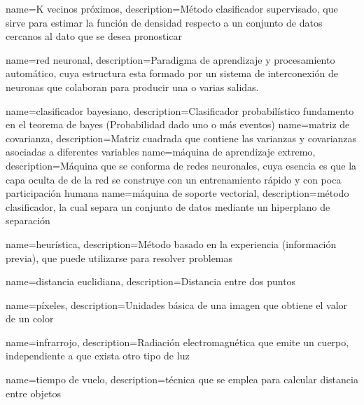 {
 name={K vecinos pr\'oximos},
 description={M\'etodo clasificador supervisado, que sirve para estimar la funci\'on de densidad respecto a un conjunto de datos cercanos al dato que se desea pronosticar}
 } 
 
 {
 name={red neuronal},
 description={Paradigma de aprendizaje y procesamiento autom\'atico, cuya estructura esta formado por un sistema de interconexi\'on de neuronas que colaboran para producir una o varias salidas.}
 }
 
 {
 name={clasificador bayesiano},
 description={Clasificador probabil\'istico fundamento en el teorema de bayes (Probabilidad dado uno o m\'as eventos)}
 }
 {
 name={matriz de covarianza},
 description={Matriz cuadrada que contiene las varianzas y covarianzas asociadas a diferentes variables}
 } 
 {
 name={m\'aquina de aprendizaje extremo},
 description={M\'aquina que se conforma de redes neuronales, cuya esencia es que la capa oculta de de la red se construye con un entrenamiento r\'apido y con poca participaci\'on humana}
 }  
 {
 name={m\'aquina de soporte vectorial},
 description={m\'etodo clasificador, la cual separa un conjunto de datos mediante un hiperplano de separaci\'on}
 }
 
 {
 name={heur\'istica},
 description={M\'etodo basado en la experiencia (informaci\'on previa), que puede utilizarse para resolver problemas }
 }

 {	
 name={distancia euclidiana},
 description={Distancia entre dos puntos}
 }
 
 
 {
 name={p\'ixeles},
 description={Unidades b\'asica de una imagen que obtiene el valor de un color}
 }
 
 {
 name={infrarrojo},
 description={Radiaci\'on electromagn\'etica que emite un cuerpo, independiente a que exista otro tipo de luz}
 }
 
 {
 name={tiempo de vuelo},
 description={t\'ecnica que se emplea para calcular distancia entre objetos}
 }